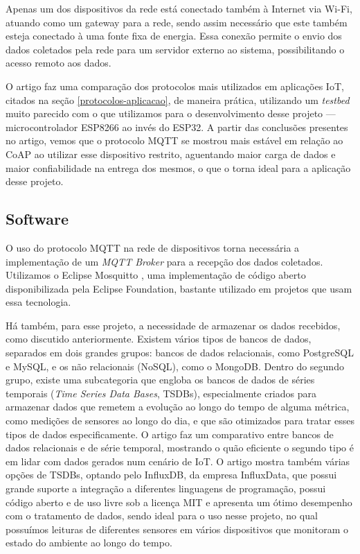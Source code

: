 \documentclass[../monografia.tex]{subfiles}
\begin{document}
Apenas um dos dispositivos da rede está conectado também à Internet via Wi-Fi, atuando como um gateway para a rede, sendo assim necessário que este também esteja conectado à uma fonte fixa de energia. Essa conexão permite o envio dos dados coletados pela rede para um servidor externo ao sistema, possibilitando o acesso remoto aos dados.

O artigo \cite{analise-protocolos-iot} faz uma comparação dos protocolos mais utilizados em aplicações IoT, citados na seção \ref{protocolos-aplicacao}, de maneira prática, utilizando um \textit{testbed} muito parecido com o que utilizamos para o desenvolvimento desse projeto --- microcontrolador ESP8266 ao invés do ESP32. A partir das conclusões presentes no artigo, vemos que o protocolo MQTT se mostrou mais estável em relação ao CoAP ao utilizar esse dispositivo restrito, aguentando maior carga de dados e maior confiabilidade na entrega dos mesmos, o que o torna ideal para a aplicação desse projeto.


\subsection{Software}

O uso do protocolo MQTT na rede de dispositivos torna necessária a implementação de um \textit{MQTT Broker} para a recepção dos dados coletados. Utilizamos o Eclipse Mosquitto \cite{mosquitto}, uma implementação de código aberto disponibilizada pela Eclipse Foundation, bastante utilizado em projetos que usam essa tecnologia.

Há também, para esse projeto, a necessidade de armazenar os dados recebidos, como discutido anteriormente. Existem vários tipos de bancos de dados, separados em dois grandes grupos: bancos de dados relacionais, como PostgreSQL e MySQL, e os não relacionais (NoSQL), como o MongoDB. Dentro do segundo grupo, existe uma subcategoria que engloba os bancos de dados de séries temporais (\textit{Time Series Data Bases}, TSDBs), especialmente criados para armazenar dados que remetem a evolução ao longo do tempo de alguma métrica, como medições de sensores ao longo do dia, e que são otimizados para tratar esses tipos de dados especificamente. O artigo \cite{timeseries-databases} faz um comparativo entre bancos de dados relacionais e de série temporal, mostrando o quão eficiente o segundo tipo é em lidar com dados gerados num cenário de IoT. O artigo mostra também várias opções de TSDBs, optando pelo InfluxDB, da empresa InfluxData, que possui grande suporte a integração a diferentes linguagens de programação, possui código aberto e de uso livre sob a licença MIT e apresenta um ótimo desempenho com o tratamento de dados, sendo ideal para o uso nesse projeto, no qual possuímos leituras de diferentes sensores em vários dispositivos que monitoram o estado do ambiente ao longo do tempo.
\end{document}
